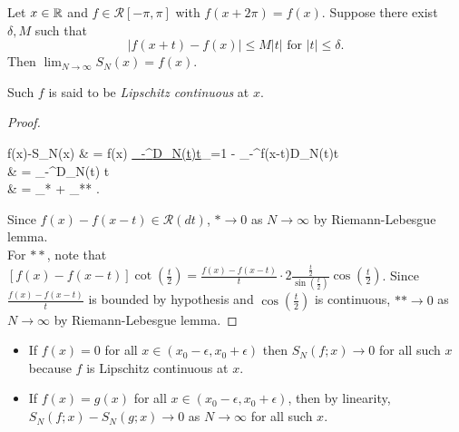 \begin{thm}[14]
	Let $x \in \mathbb{R}$ and $f \in \mathscr{R}[-\pi,\pi]$ with $f(x+2\pi)=f(x)$.
	Suppose there exist $\delta,M$ such that
	\[
		\left|f(x+t)-f(x)\right|\le M \left|t\right| \text{ for } \left|t\right|\le \delta
		.\]
	Then $\lim_{N\to \infty}{S_N(x)}=f(x)$.
	\begin{remark}
		Such $f$ is said to be \textit{Lipschitz continuous} at $x$.
	\end{remark}
	\begin{proof}
		\begin{flalign*}
			f(x)-S_N(x) & = f(x) \cdot \underline{ \int_{-\pi}^{\pi}{D_N(t)t}}_{=1} -  \int_{-\pi}^{\pi}{f(x-t)D_N(t)t}                                                                                \\
			            & = \int_{-\pi}^{\pi}{\left[f(x)-f(x-t)\right]D_N(t) t}                                                                                                                                                \\
			            & = _{*} + _{**}
			.\end{flalign*}
		Since $f(x)-f(x-t) \in \mathscr{R}(dt)$, $* \to 0$ as $N\to \infty$ by Riemann-Lebesgue lemma.\\
		For $**$, note that $\left[f(x)-f(x-t)\right] \cot{(\frac{t}{2})}= \frac{f(x)-f(x-t)}{t} \cdot 2 \frac{\frac{t}{2}}{\sin{(\frac{t}{2})}} \cos{(\frac{t}{2})}$.
		Since $\frac{f(x)-f(x-t)}{t}$ is bounded by hypothesis and $\cos{(\frac{t}{2})}$ is continuous, $** \to 0$ as $N\to \infty$ by Riemann-Lebesgue lemma.
	\end{proof}
\end{thm}
\begin{corollary}
	\begin{itemize}
		\item
		      If $f(x)=0$ for all $x \in (x_{0}-\epsilon,x_{0}+\epsilon)$ then $S_N(f;x)\to 0$ for all such $x$ because $f$ is Lipschitz continuous at $x$.
		\item If $f(x)=g(x)$ for all $x \in (x_{0}-\epsilon,x_{0}+\epsilon)$, then by linearity, $S_N(f;x)- S_N(g;x)\to 0$ as $N\to \infty$ for all such $x$.
	\end{itemize}
\end{corollary}

